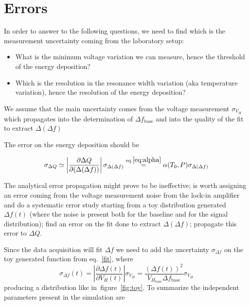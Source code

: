 \documentclass[a4paper,12pt]{article}
\begin{document}

\section{Errors}

In order to answer to the following questions, we need to find which is the measurement uncertainty coming from the laboratory setup:
\begin{itemize}

  \item What is the minimum voltage variation we can measure, hence the threshold of the energy deposition? 
  \item Which is the resolution in the resonance width variation (aka temperature variation), hence the resolution of the energy deposition?

\end{itemize}

We assume that the main uncertainty comes from the voltage measurement $\sigma_{V_H}$ which propagates into the determination of $\Delta f_\mathrm{base}$
and into the quality of the fit to extract $\Delta (\Delta f)$

The error on the energy deposition should be

\begin{equation}
  \sigma_{\Delta Q}  \simeq \left| \frac{\partial \Delta Q}{\partial(\Delta(\Delta f))} \right| \sigma_{\Delta (\Delta f)} \overset{\mathrm{eq. \ref{eq:alpha}}}{=} \alpha (T_0,P) \sigma_{\Delta (\Delta f)}
\end{equation}

The analytical error propagation might prove to be ineffective; is worth assigning an error coming from the voltage measurement noise from the lock-in amplifier and do a systematic error study starting from a toy distribution generated $\Delta f(t)$ (where the noise is present both for the baseline and for the signal distribution); find an error on the fit done to extract $\Delta (\Delta f)$; propagate this error to $\Delta Q$.

Since the data acquisition will fit $\Delta f$ we need to add the uncertainty $\sigma_{\Delta f}$ on the toy generated function from eq.~\ref{fit}, where
\begin{equation}
\sigma_{\Delta f}(t) = \left| \frac{\partial \Delta f(t)}{\partial V_H(t)} \right| \sigma_{V_H} = \frac{(\Delta f(t))^2}{V_{H_{\mathrm{base}}} \Delta f_\mathrm{base}} \sigma_{V_H}
\end{equation}
producing a distribution like in~figure~\ref{fig:toy}. To summarize the independent parameters present in the simulation are
\end{document}
